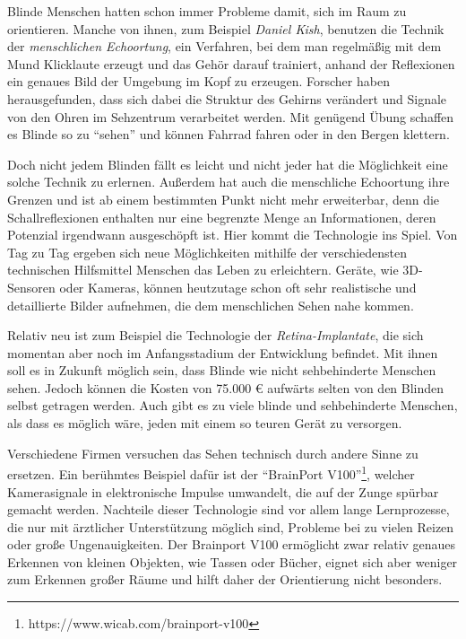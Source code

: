 \documentclass[a4paper,12pt,ngerman]{scrartcl}
\begin{document}
Blinde Menschen hatten schon immer Probleme damit, sich im Raum zu orientieren.
Manche von ihnen, zum Beispiel \textit{Daniel Kish}, benutzen die Technik der 
\textit{menschlichen Echoortung}, ein Verfahren, bei dem
man regelmäßig mit dem Mund Klicklaute erzeugt und das Gehör darauf trainiert,
anhand der Reflexionen ein genaues Bild der Umgebung im Kopf zu erzeugen.
Forscher haben herausgefunden, dass sich dabei die Struktur des Gehirns verändert 
und Signale von den Ohren im Sehzentrum verarbeitet werden.
Mit genügend Übung schaffen es Blinde so zu \enquote{sehen} und können Fahrrad 
fahren oder in den Bergen klettern. \par 
Doch nicht jedem Blinden fällt es leicht und nicht jeder hat die Möglichkeit eine
solche Technik zu erlernen. Außerdem hat auch die menschliche Echoortung ihre
Grenzen und ist ab einem bestimmten Punkt nicht mehr erweiterbar, denn die Schallreflexionen
enthalten nur eine begrenzte Menge an Informationen, deren Potenzial irgendwann ausgeschöpft
ist. Hier kommt die 
Technologie ins Spiel. Von Tag zu Tag ergeben sich neue Möglichkeiten mithilfe 
der verschiedensten technischen Hilfsmittel Menschen das Leben zu erleichtern.
Geräte, wie 3D-Sensoren oder Kameras, können heutzutage schon oft sehr realistische
und detaillierte Bilder aufnehmen, die dem menschlichen Sehen nahe kommen. \par 
Relativ neu ist zum Beispiel die Technologie der \textit{Retina-Implantate}, die sich 
momentan aber noch im Anfangsstadium der Entwicklung befindet. Mit ihnen soll es in 
Zukunft möglich sein, dass Blinde wie nicht sehbehinderte Menschen sehen. Jedoch
können die Kosten von 75.000 \euro{} aufwärts selten von den Blinden selbst getragen
werden. Auch gibt es zu viele
blinde und sehbehinderte Menschen, als dass es möglich wäre, jeden mit einem so 
teuren Gerät zu versorgen.\par 
Verschiedene Firmen versuchen das Sehen technisch durch andere Sinne zu ersetzen.
Ein berühmtes Beispiel dafür ist der 
\enquote{BrainPort V100}\footnote{https://www.wicab.com/brainport-v100}, welcher 
Kamerasignale in elektronische Impulse umwandelt, die auf der Zunge spürbar
gemacht werden. Nachteile dieser
Technologie sind vor allem lange Lernprozesse, die nur mit ärztlicher Unterstützung
möglich sind, Probleme bei zu vielen Reizen oder große Ungenauigkeiten. Der Brainport V100 ermöglicht
zwar relativ genaues Erkennen von kleinen Objekten, wie Tassen oder Bücher, eignet sich aber weniger zum
Erkennen großer Räume und hilft daher der Orientierung nicht besonders.
\end{document}
